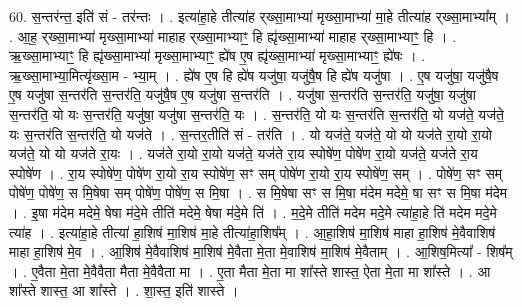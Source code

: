 \documentclass[17pt]{extarticle}
\begin{document}
60. स॒न्तर॑न्त॒ इति॑ सं - तर॑न्तः । . इत्या॑हा॒हे तीत्या॑ह र्‌ख्सा॒माभ्या॑ मृख्सा॒माभ्या॑ मा॒हे तीत्या॑ह र्‌ख्सा॒माभ्या᳚म् । . आ॒ह॒ र्‌ख्सा॒माभ्या॑ मृख्सा॒माभ्या॑ माहाह र्‌ख्सा॒माभ्याꣳ॒॒ हि ह्यृ॑ख्सा॒माभ्या॑ माहाह र्‌ख्सा॒माभ्याꣳ॒॒ हि । . ऋ॒ख्सा॒माभ्याꣳ॒॒ हि ह्यृ॑ख्सा॒माभ्या॑ मृख्सा॒माभ्याꣳ॒॒ ह्ये॑ष ए॒ष ह्यृ॑ख्सा॒माभ्या॑ मृख्सा॒माभ्याꣳ॒॒ ह्ये॑षः । . ऋ॒ख्सा॒माभ्या॒मित्यृ॑ख्सा॒म - भ्या॒म् । . ह्ये॑ष ए॒ष हि ह्ये॑ष यजु॑षा॒ यजु॑षै॒ष हि ह्ये॑ष यजु॑षा । . ए॒ष यजु॑षा॒ यजु॑षै॒ष ए॒ष यजु॑षा स॒न्तर॑ति स॒न्तर॑ति॒ यजु॑षै॒ष ए॒ष यजु॑षा स॒न्तर॑ति । . यजु॑षा स॒न्तर॑ति स॒न्तर॑ति॒ यजु॑षा॒ यजु॑षा स॒न्तर॑ति॒ यो यः स॒न्तर॑ति॒ यजु॑षा॒ यजु॑षा स॒न्तर॑ति॒ यः । . स॒न्तर॑ति॒ यो यः स॒न्तर॑ति स॒न्तर॑ति॒ यो यज॑ते॒ यज॑ते॒ यः स॒न्तर॑ति स॒न्तर॑ति॒ यो यज॑ते । . स॒न्तर॒तीति॑ सं - तर॑ति । . यो यज॑ते॒ यज॑ते॒ यो यो यज॑ते रा॒यो रा॒यो यज॑ते॒ यो यो यज॑ते रा॒यः । . यज॑ते रा॒यो रा॒यो यज॑ते॒ यज॑ते रा॒य स्पोषे॑ण॒ पोषे॑ण रा॒यो यज॑ते॒ यज॑ते रा॒य स्पोषे॑ण । . रा॒य स्पोषे॑ण॒ पोषे॑ण रा॒यो रा॒य स्पोषे॑ण॒ सꣳ सम् पोषे॑ण रा॒यो रा॒य स्पोषे॑ण॒ सम् । . पोषे॑ण॒ सꣳ सम् पोषे॑ण॒ पोषे॑ण॒ स मि॒षेषा सम् पोषे॑ण॒ पोषे॑ण॒ स मि॒षा । . स मि॒षेषा सꣳ स मि॒षा म॑देम मदेमे॒ षा सꣳ स मि॒षा म॑देम । . इ॒षा म॑देम मदेमे॒ षेषा म॑दे॒मे तीति॑ मदेमे॒ षेषा म॑दे॒मे ति॑ । . म॒दे॒मे तीति॑ मदेम मदे॒मे त्या॑हा॒हे ति॑ मदेम मदे॒मे त्या॑ह । . इत्या॑हा॒हे तीत्या॑ हा॒शिष॑ मा॒शिष॑ मा॒हे तीत्या॑हा॒शिष᳚म् । . आ॒हा॒शिष॑ मा॒शिष॑ माहा हा॒शिष॑ मे॒वैवाशिष॑ माहा हा॒शिष॑ मे॒व । . आ॒शिष॑ मे॒वैवाशिष॑ मा॒शिष॑ मे॒वैता मे॒ता मे॒वाशिष॑ मा॒शिष॑ मे॒वैताम् । . आ॒शिष॒मित्या᳚ - शिष᳚म् । . ए॒वैता मे॒ता मे॒वैवैता मैता मे॒वैवैता मा । . ए॒ता मैता मे॒ता मा शा᳚स्ते शास्त॒ ऐता मे॒ता मा शा᳚स्ते । . आ शा᳚स्ते शास्त॒ आ शा᳚स्ते । . शा॒स्त॒ इति॑ शास्ते । \newline
\pagebreak
{}
\end{document}
